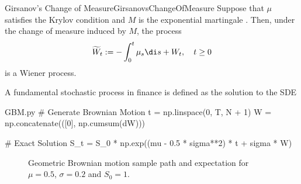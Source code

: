 \begin{thm}{Girsanov's Change of Measure}{GirsanovsChangeOfMeasure}
	Suppose that $\mu$ satisfies the Krylov condition  and $M$ is the exponential martingale . Then, under the change of measure  induced by $M$, the \Ito{} process
	\begin{equation*}
		\widetilde{W}_t := -\int_0^t \mu_s \di s + W_t, \quad t \ge 0
	\end{equation*}
	is a Wiener process.
\end{thm}

A fundamental stochastic process in finance is defined as the solution to the SDE

\begin{Pcode}{GBM.py}
	# Generate Brownian Motion
	t = np.linspace(0, T, N + 1)
	W = np.concatenate(([0], np.cumsum(dW)))

	# Exact Solution
	S_t = S_0 * np.exp((mu - 0.5 * sigma**2) * t + sigma * W)
\end{Pcode}

\begin{figure}[H]
	\centering
	
	\caption{Geometric Brownian motion sample path and expectation for $\mu=0.5$, $\sigma=0.2$ and $S_0=1$.}
	\label{fig:geometricBrownianMotion}
\end{figure}
